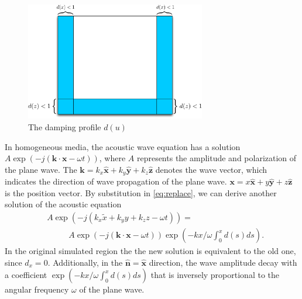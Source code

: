 \documentclass[11pt,titlepage]{article}
\newcommand{\bx}{\boldsymbol{x}}
\newcommand{\bk}{\boldsymbol{k}}
\newcommand{\hx}{\hat{\mathbf{x}}}
\newcommand{\hy}{\hat{\mathbf{y}}}
\newcommand{\hz}{\hat{\mathbf{z}}}
\theoremstyle{plain}
\theoremstyle{definition}
\theoremstyle{remark}
\numberwithin{equation}{section}
\begin{document}
\begin{figure}[htbp]
\centering
\includegraphics[width=0.7\textwidth]{Fig/SpongeABC.pdf}
\caption{The damping profile $d(u)$}
\end{figure}
In homogeneous media, the acoustic wave equation has a solution $A \exp(-j (\bk \cdot \bx -\omega t))$, where $A$ represents the amplitude and polarization of the plane wave. The $\bk = k_x \hx + k_y \hy +k_z \hz$ denotes the wave vector, which indicates the direction of wave propagation of the plane wave. $\bx = x\hx +y\hy +z \hz$ is the position vector. By substitution  in \eqref{eq:replace}, we can derive another solution of the acoustic equation
\begin{equation}
\begin{aligned}
&A\exp(-j(k_x \tilde{x} + k_y y + k_z z -\omega t))=\\
 &~~~~~~~~~~~~A\exp(-j (\bk\cdot \bx -\omega t))\exp(-kx/\omega \int_0^x d(s)ds).
\end{aligned}
\end{equation}
In the original simulated region the the new solution is equivalent to the old one, since $d_x=0$. Additionally, in the $\hat{\mathbf{n}}= \hx$ direction, the wave amplitude decay with a coefficient $\exp(-kx/\omega \int_0^x d(s)ds)$ that is inversely proportional to the angular frequency $\omega$ of the plane wave. 
\end{document}
